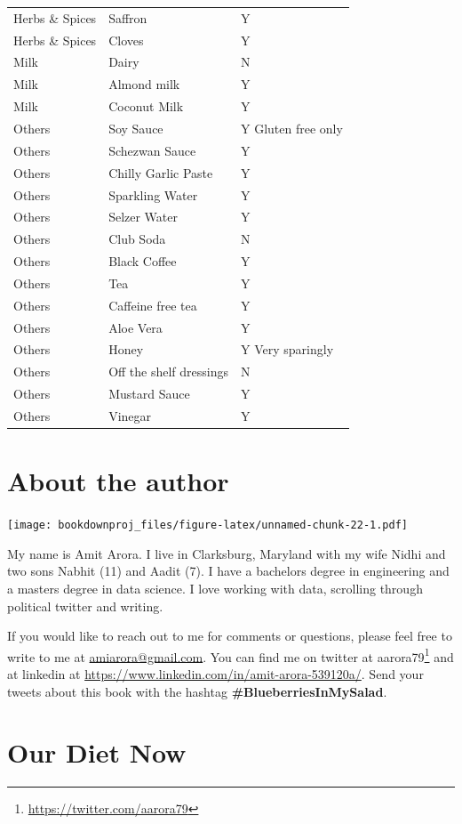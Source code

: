 \documentclass[
  oneside]{book}
\DeclareRobustCommand{\href}[2]{#2\footnote{\url{#1}}}
\begin{document}
\begin{longtable}[t]{lll}
Herbs \& Spices & Saffron & Y\\
\addlinespace
Herbs \& Spices & Cloves & Y\\
Milk & Dairy & N\\
Milk & Almond milk & Y\\
Milk & Coconut Milk & Y\\
Others & Soy Sauce & Y
Gluten free only\\
\addlinespace
Others & Schezwan Sauce & Y\\
Others & Chilly Garlic Paste & Y\\
Others & Sparkling Water & Y\\
Others & Selzer Water & Y\\
Others & Club Soda & N\\
\addlinespace
Others & Black Coffee & Y\\
Others & Tea & Y\\
Others & Caffeine free tea & Y\\
Others & Aloe Vera & Y\\
Others & Honey & Y
Very sparingly\\
\addlinespace
Others & Off the shelf dressings & N\\
Others & Mustard Sauce & Y\\
Others & Vinegar & Y\\*
\end{longtable}

\hypertarget{about-the-author}{%
\chapter{About the author}\label{about-the-author}}

\texttt{[image: bookdownproj\_files/figure-latex/unnamed-chunk-22-1.pdf]}

My name is Amit Arora. I live in Clarksburg, Maryland with my wife Nidhi and two sons Nabhit (11) and Aadit (7). I have a bachelors degree in engineering and a masters degree in data science. I love working with data, scrolling through political twitter and writing.

If you would like to reach out to me for comments or questions, please feel free to write to me at \url{amiarora@gmail.com}. You can find me on twitter at \href{https://twitter.com/aarora79}{aarora79} and at linkedin at \url{https://www.linkedin.com/in/amit-arora-539120a/}. Send your tweets about this book with the hashtag \textbf{\#BlueberriesInMySalad}.

\hypertarget{our-diet-now}{%
\chapter{Our Diet Now}\label{our-diet-now}}
\end{document}
